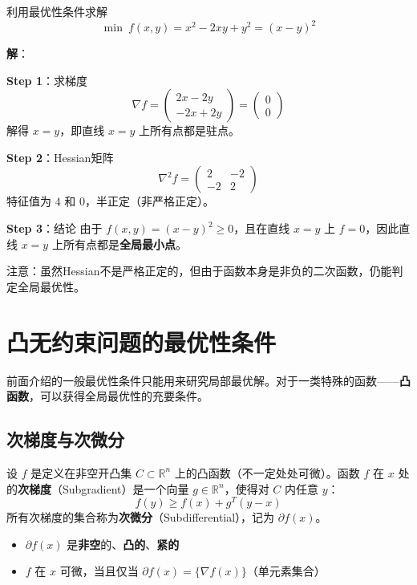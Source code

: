 \begin{example}\label{ex:optimality2}
利用最优性条件求解
\[
\min\ f(x, y) = x^2 - 2xy + y^2 = (x-y)^2
\]

\textbf{解}：

\textbf{Step 1}：求梯度
\[
\nabla f = \begin{pmatrix} 2x - 2y \\ -2x + 2y \end{pmatrix} = \begin{pmatrix} 0 \\ 0 \end{pmatrix}
\]
解得 $x = y$，即直线 $x = y$ 上所有点都是驻点。

\textbf{Step 2}：Hessian矩阵
\[
\nabla^2 f = \begin{pmatrix} 2 & -2 \\ -2 & 2 \end{pmatrix}
\]
特征值为 $4$ 和 $0$，半正定（非严格正定）。

\textbf{Step 3}：结论
由于 $f(x,y) = (x-y)^2 \geq 0$，且在直线 $x = y$ 上 $f = 0$，因此直线 $x = y$ 上所有点都是\textbf{全局最小点}。

注意：虽然Hessian不是严格正定的，但由于函数本身是非负的二次函数，仍能判定全局最优性。
\end{example}

\section{凸无约束问题的最优性条件}\label{sec:convex-optimality}

前面介绍的一般最优性条件只能用来研究局部最优解。对于一类特殊的函数——\textbf{凸函数}，可以获得全局最优性的充要条件。

\subsection{次梯度与次微分}

\begin{definition}[次梯度]
设 $f$ 是定义在非空开凸集 $C \subset \mathbb{R}^n$ 上的凸函数（不一定处处可微）。函数 $f$ 在 $x$ 处的\textbf{次梯度}（Subgradient）是一个向量 $g \in \mathbb{R}^n$，使得对 $C$ 内任意 $y$：
\[
f(y) \geq f(x) + g^T(y - x)
\]
所有次梯度的集合称为\textbf{次微分}（Subdifferential），记为 $\partial f(x)$。
\end{definition}

\begin{property}[次微分的性质]
\begin{itemize}[itemsep=0.3em]
    \item $\partial f(x)$ 是\textbf{非空}的、\textbf{凸的}、\textbf{紧的}
    \item $f$ 在 $x$ 可微，当且仅当 $\partial f(x) = \{\nabla f(x)\}$（单元素集合）
\end{itemize}
\end{property}

